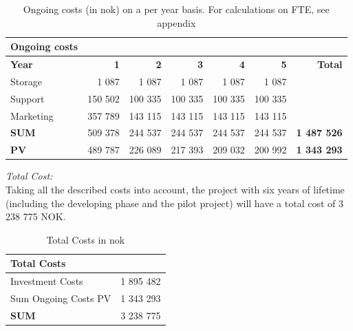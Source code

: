 \begin{table}
\centering
    \begin{tabular}{|l|r|r|r|r|r|r|}
        \hline
       \textbf{Ongoing costs}  & & & & & & \\ \hline
      \textbf{Year} & \textbf{1} & \textbf{2} & \textbf{3} & \textbf{4} & \textbf{5} & \textbf{Total}\\ \hline
	   Storage & 1 087 & 1 087 & 1 087 & 1 087 & 1 087 &\\ \hline
	  Support & 150 502 & 100 335 & 100 335 & 100 335 & 100 335 & \\ \hline
	  Marketing & 357 789 & 143 115 & 143 115 & 143 115 & 143 115 & \\ \hline
	   \textbf{SUM} & 509 378 & 244 537 & 244 537 & 244 537 & 244 537 & \textbf{1 487 526} \\ \hline  
	   \textbf{PV} & 489 787 & 226 089 & 217 393 & 209 032 & 200 992 & \textbf{1 343 293}  \\ \hline
    \end{tabular}
    \caption[Ongoing costs on a per year basis]{Ongoing costs (in \ac{nok}) on a per year basis. For calculations on FTE, see appendix}
    \label{tab:ongoing}
\end{table}
\emph{Total Cost:}\\
Taking all the described costs into account, the project with six years of lifetime (including the developing phase and the pilot project) will have a total cost of 3 238 775 NOK.

\begin{table}[h]
\centering
\begin{tabular}{|l|r|}
\hline
\textbf{Total Costs} & \\ \hline
Investment Costs & 1 895 482 \\ \hline
Sum Ongoing Costs PV & 1 343 293 \\ \hline
\textbf{SUM} & 3 238 775 \\ \hline
\end{tabular}
\caption[Total Costs]{Total Costs in \ac{nok}}
\label{tab:totalcosts}
\end{table}

